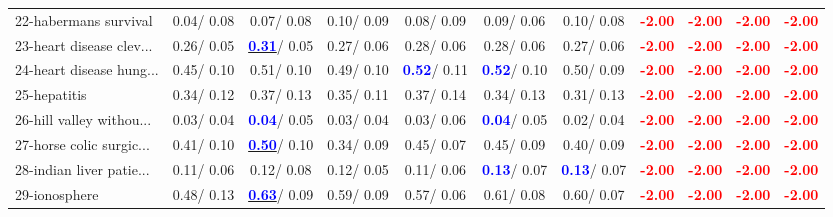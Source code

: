 \begin{table}[h]
\begin{center}
{\begin{tabular}{lc|c|c|c|c|c|c|c|c|c}
22-habermans survival &   0.04/  0.08 &   0.07/  0.08 &   0.10/  0.09 &   0.08/  0.09 &   0.09/  0.06 &   0.10/  0.08 & \textcolor{red}{\textbf{ -2.00}} & \textcolor{red}{\textbf{ -2.00}} & \textcolor{red}{\textbf{ -2.00}} & \textcolor{red}{\textbf{ -2.00}} \\
23-heart disease clev... &   0.26/  0.05 & \underline{\textcolor{blue}{\textbf{  0.31}}}/  0.05 &   0.27/  0.06 &   0.28/  0.06 &   0.28/  0.06 &   0.27/  0.06 & \textcolor{red}{\textbf{ -2.00}} & \textcolor{red}{\textbf{ -2.00}} & \textcolor{red}{\textbf{ -2.00}} & \textcolor{red}{\textbf{ -2.00}} \\
24-heart disease hung... &   0.45/  0.10 &   0.51/  0.10 &   0.49/  0.10 & \textcolor{blue}{\textbf{  0.52}}/  0.11 & \textcolor{blue}{\textbf{  0.52}}/  0.10 &   0.50/  0.09 & \textcolor{red}{\textbf{ -2.00}} & \textcolor{red}{\textbf{ -2.00}} & \textcolor{red}{\textbf{ -2.00}} & \textcolor{red}{\textbf{ -2.00}} \\
25-hepatitis &   0.34/  0.12 &   0.37/  0.13 &   0.35/  0.11 &   0.37/  0.14 &   0.34/  0.13 &   0.31/  0.13 & \textcolor{red}{\textbf{ -2.00}} & \textcolor{red}{\textbf{ -2.00}} & \textcolor{red}{\textbf{ -2.00}} & \textcolor{red}{\textbf{ -2.00}} \\
26-hill valley withou... &   0.03/  0.04 & \textcolor{blue}{\textbf{  0.04}}/  0.05 &   0.03/  0.04 &   0.03/  0.06 & \textcolor{blue}{\textbf{  0.04}}/  0.05 &   0.02/  0.04 & \textcolor{red}{\textbf{ -2.00}} & \textcolor{red}{\textbf{ -2.00}} & \textcolor{red}{\textbf{ -2.00}} & \textcolor{red}{\textbf{ -2.00}} \\
27-horse colic surgic... &   0.41/  0.10 & \underline{\textcolor{blue}{\textbf{  0.50}}}/  0.10 &   0.34/  0.09 &   0.45/  0.07 &   0.45/  0.09 &   0.40/  0.09 & \textcolor{red}{\textbf{ -2.00}} & \textcolor{red}{\textbf{ -2.00}} & \textcolor{red}{\textbf{ -2.00}} & \textcolor{red}{\textbf{ -2.00}} \\
28-indian liver patie... &   0.11/  0.06 &   0.12/  0.08 &   0.12/  0.05 &   0.11/  0.06 & \textcolor{blue}{\textbf{  0.13}}/  0.07 & \textcolor{blue}{\textbf{  0.13}}/  0.07 & \textcolor{red}{\textbf{ -2.00}} & \textcolor{red}{\textbf{ -2.00}} & \textcolor{red}{\textbf{ -2.00}} & \textcolor{red}{\textbf{ -2.00}} \\ \hline
29-ionosphere &   0.48/  0.13 & \underline{\textcolor{blue}{\textbf{  0.63}}}/  0.09 &   0.59/  0.09 &   0.57/  0.06 &   0.61/  0.08 &   0.60/  0.07 & \textcolor{red}{\textbf{ -2.00}} & \textcolor{red}{\textbf{ -2.00}} & \textcolor{red}{\textbf{ -2.00}} & \textcolor{red}{\textbf{ -2.00}} \\

\end{tabular}}
\end{center}
\end{table}
